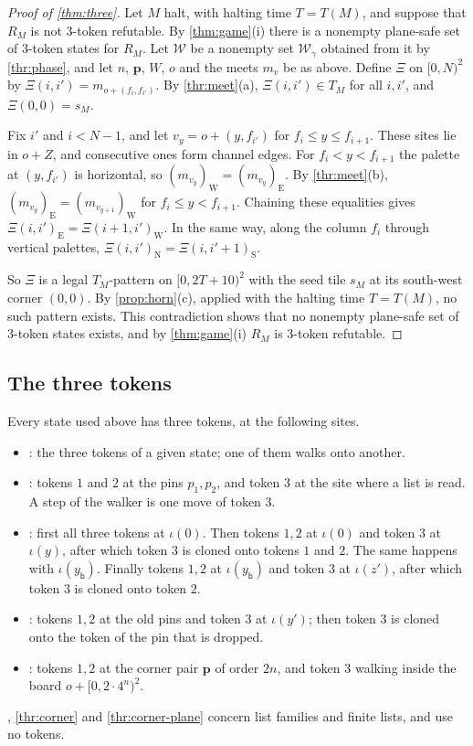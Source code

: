 \begin{proof}[Proof of \cref{thm:three}]
Let $M$ halt, with halting time $T=T(M)$, and suppose that $R_M$ is not $3$-token refutable. By \cref{thm:game}(i) there is a nonempty plane-safe set of $3$-token states for $R_M$. Let $\mathcal W$ be a nonempty set $\mathcal W_\gamma$ obtained from it by \cref{thr:phase}, and let $n$, $\mathbf p$, $W$, $o$ and the meets $m_v$ be as above. Define $\Xi$ on $[0,N)^2$ by $\Xi(i,i')=m_{o+(f_i,f_{i'})}$. By \cref{thr:meet}(a), $\Xi(i,i')\in T_M$ for all $i,i'$, and $\Xi(0,0)=s_M$.

Fix $i'$ and $i<N-1$, and let $v_y=o+(y,f_{i'})$ for $f_i\le y\le f_{i+1}$. These sites lie in $o+Z$, and consecutive ones form channel edges. For $f_i<y<f_{i+1}$ the palette at $(y,f_{i'})$ is horizontal, so $(m_{v_y})_{\mathrm W}=(m_{v_y})_{\mathrm E}$. By \cref{thr:meet}(b), $(m_{v_y})_{\mathrm E}=(m_{v_{y+1}})_{\mathrm W}$ for $f_i\le y<f_{i+1}$. Chaining these equalities gives $\Xi(i,i')_{\mathrm E}=\Xi(i+1,i')_{\mathrm W}$. In the same way, along the column $f_i$ through vertical palettes, $\Xi(i,i')_{\mathrm N}=\Xi(i,i'+1)_{\mathrm S}$.

So $\Xi$ is a legal $T_M$-pattern on $[0,2T+10)^2$ with the seed tile $s_M$ at its south-west corner $(0,0)$. By \cref{prop:horn}(c), applied with the halting time $T=T(M)$, no such pattern exists. This contradiction shows that no nonempty plane-safe set of $3$-token states exists, and by \cref{thm:game}(i) $R_M$ is $3$-token refutable.
\end{proof}

\subsection{The three tokens}\label{thr:sec-budget}

Every state used above has three tokens, at the following sites.
\begin{itemize}
\item {}: the three tokens of a given state; one of them walks onto another.
\item {}: tokens $1$ and $2$ at the pins $p_1,p_2$, and token $3$ at the site where a list is read. A step of the walker is one move of token $3$.
\item {}: first all three tokens at $\iota(0)$. Then tokens $1,2$ at $\iota(0)$ and token $3$ at $\iota(y)$, after which token $3$ is cloned onto tokens $1$ and $2$. The same happens with $\iota(y_{\mathsf b})$. Finally tokens $1,2$ at $\iota(y_{\mathsf b})$ and token $3$ at $\iota(z')$, after which token $3$ is cloned onto token $2$.
\item {}: tokens $1,2$ at the old pins and token $3$ at $\iota(y')$; then token $3$ is cloned onto the token of the pin that is dropped.
\item {}: tokens $1,2$ at the corner pair $\mathbf p$ of order $2n$, and token $3$ walking inside the board $o+[0,2\cdot4^n)^2$.
\end{itemize}
, \cref{thr:corner} and \cref{thr:corner-plane} concern list families and finite lists, and use no tokens.

